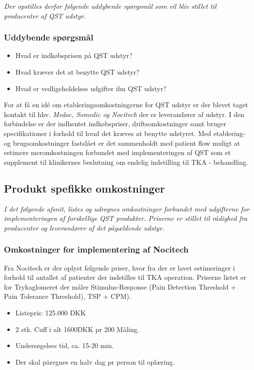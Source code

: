 \textit{Der opstilles derfor følgende uddybende spørgsmål som vil bliv stillet til producenter af QST udstyr. }

\subsubsection*{Uddybende spørgsmål}

\begin{itemize}  
\item Hvad er indkøbsprisen på QST udstyr? 
\item Hvad kræver det at benytte QST udstyr? 
\item Hvad er vedligeholdelses udgifter ifm QST udstyr?
\end{itemize}


For at få en idé om etableringsomkostningerne for QST udstyr er der blevet taget kontakt til hhv. \emph{Medoc, Somedic og Nocitech} der er leverandører af udstyr. I den forbindelse er der indhentet indkøbspriser, driftsomkostninger samt bruger specifikationer i forhold til hvad det kræves at benytte udstyret. Med etablering- og brugsomkostninger fastslået er det sammenholdt med patient flow muligt at estimere meromkostningen forbundet med implementeringen af QST som et supplement til klinikernes beslutning om endelig indstilling til TKA - behandling. 

\subsection{Produkt spefikke omkostninger}
\textit{I det følgende afsnit, listes og udregnes omkostninger forbundet med udgifterne for implementeringen af forskellige QST produkter. Priserne er stillet til rådighed fra producenter og leverandører af det pågældende udstyr.}
\subsubsection{Omkostninger for implementering af Nocitech}
\label{priser}

Fra Nocitech er der oplyst følgende priser, hvor fra der er lavet estimeringer i forhold til antallet af patienter der indstilles til TKA operation. Priserne listet er for Trykaglomeret der måler Stimulus-Response (Pain Detection Threshold + Pain Tolerance Threshold), TSP + CPM).

\begin{itemize}  
\item Listepris: 125.000 DKK
\item 2 stk. Cuff i  alt 1600DKK pr 200 Måling.
\item Undersøgelses tid, ca. 15-20 min.
\item Der skal påregnes en halv dag pr person til oplæring.
\end{itemize}

